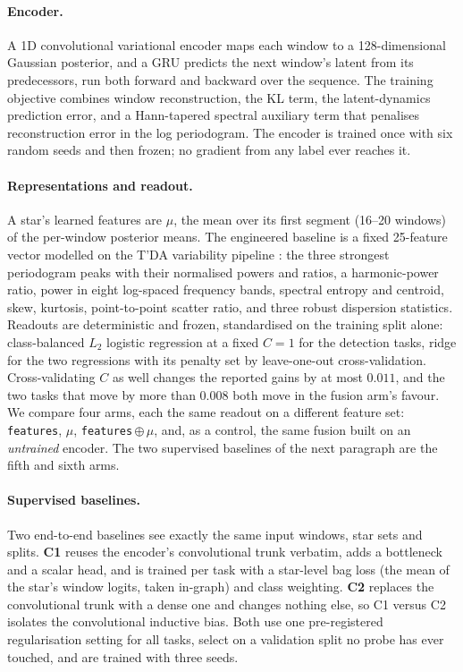 \documentclass{article}
\begin{document}
\paragraph{Encoder.} A 1D convolutional variational encoder \citep{kingma2014} maps each window to a
128-dimensional Gaussian posterior, and a GRU \citep{cho2014} predicts the next window's latent from
its predecessors, run both forward and backward over the sequence. The training objective combines
window reconstruction, the KL term, the latent-dynamics prediction error, and a Hann-tapered spectral
auxiliary term that penalises reconstruction error in the log periodogram. The encoder is trained
once with six random seeds and then frozen; no gradient from any label ever reaches it.

\paragraph{Representations and readout.} A star's learned features are $\mu$, the mean over its first
segment (16--20 windows) of the per-window posterior means. The engineered baseline is a fixed
25-feature vector modelled on the T'DA variability pipeline \citep{audenaert2021}: the three
strongest periodogram peaks with their normalised powers and ratios, a harmonic-power ratio, power in
eight log-spaced frequency bands, spectral entropy and centroid, skew, kurtosis, point-to-point
scatter ratio, and three robust dispersion statistics. Readouts are deterministic and frozen,
standardised on the training split alone: class-balanced $L_{2}$ logistic regression at a fixed
$C = 1$ for the detection tasks, ridge for the two regressions with its penalty set by leave-one-out
cross-validation. Cross-validating $C$ as well changes the reported gains by at most $0.011$, and the
two tasks that move by more than $0.008$ both move in the fusion arm's favour. We compare four
arms, each the same readout on a different feature set: \texttt{features}, $\mu$,
\texttt{features}\,$\oplus\,\mu$, and, as a control, the same fusion built on an \emph{untrained}
encoder. The two supervised baselines of the next paragraph are the fifth and sixth arms.

\paragraph{Supervised baselines.} Two end-to-end baselines see exactly the same input windows, star
sets and splits. \textbf{C1} reuses the encoder's convolutional trunk verbatim, adds a bottleneck and
a scalar head, and is trained per task with a star-level bag loss (the mean of the star's window
logits, taken in-graph) and class weighting. \textbf{C2} replaces the convolutional trunk with a
dense one and changes nothing else, so C1 versus C2 isolates the convolutional inductive bias. Both
use one pre-registered regularisation setting for all tasks, select on a validation split no probe
has ever touched, and are trained with three seeds.
\end{document}

